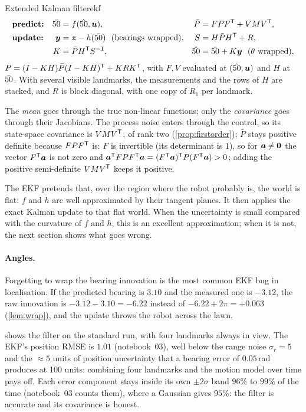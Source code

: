 \begin{definition}{Extended Kalman filter}{ekf}
\begin{align*}
  &\textbf{predict:}&\bx&=f(\hx,\uu), & \bar P&=FPF\T+VMV\T,\\
  &\textbf{update:}& \y&=\z-h(\bx)\ \ (\text{bearings wrapped}), &
  S&=H\bar PH\T+R,\\
  && K&=\bar PH\T S^{-1}, & \hx&=\bx+K\y\ \ (\theta\ \text{wrapped}),
\end{align*}
$P=(I-KH)\bar P(I-KH)^{\mathsf{T}}+KRK^{\mathsf{T}}$, with $F,V$ evaluated at $(\hat{50},\bm{u})$ and
$H$ at $\bar{50}$. With several visible landmarks, the measurements and the
rows of $H$ are stacked, and $R$ is block diagonal, with one copy of $R_1$
per landmark.
\end{definition}

The \emph{mean} goes through the true non-linear functions; only the
\emph{covariance} goes through their Jacobians. The process noise enters
through the control, so its state-space covariance is $VMV^{\mathsf{T}}$, of rank
two (\cref{prop:firstorder}); $\bar P$ stays positive definite because
$FPF^{\mathsf{T}}$ is: $F$ is invertible (its determinant is $1$), so for
$\bm{a}\neq\bm{0}$ the vector $F^{\mathsf{T}}\bm{a}$ is not zero and
$\bm{a}^{\mathsf{T}} FPF^{\mathsf{T}}\bm{a}=(F^{\mathsf{T}}\bm{a})^{\mathsf{T}} P(F^{\mathsf{T}}\bm{a})>0$; adding the
positive semi-definite $VMV^{\mathsf{T}}$ keeps it positive.

\begin{inwords}
The EKF pretends that, over the region where the robot probably is, the
world is flat: $f$ and $h$ are well approximated by their tangent planes.
It then applies the exact Kalman update to that flat world. When the
uncertainty is small compared with the curvature of $f$ and $h$, this is
an excellent approximation; when it is not, the next section shows what
goes wrong.
\end{inwords}

\paragraph{Angles.} Forgetting to wrap the bearing innovation is the most
common EKF bug in localisation. If the predicted bearing is $3.10$ and the
measured one is $-3.12$, the raw innovation is $-3.12-3.10=-6.22$
instead of $-6.22+2\pi=+0.063$ (\cref{lem:wrap}), and the update throws the robot across the lawn.

 shows the filter on the standard run, with four
landmarks always in view. The EKF's position RMSE is $1.01$ (notebook~03), well below the range
noise $\sigma_r=5$ and the $\approx5$ units of position uncertainty
that a bearing error of $0.05$\,rad produces at 100 units: combining four
landmarks and the motion model over time pays off. Each error component
stays inside its own $\pm2\sigma$ band $96\%$ to $99\%$ of the time
(notebook~03 counts them), where a Gaussian gives $95\%$: the filter is accurate and its covariance is
honest.

